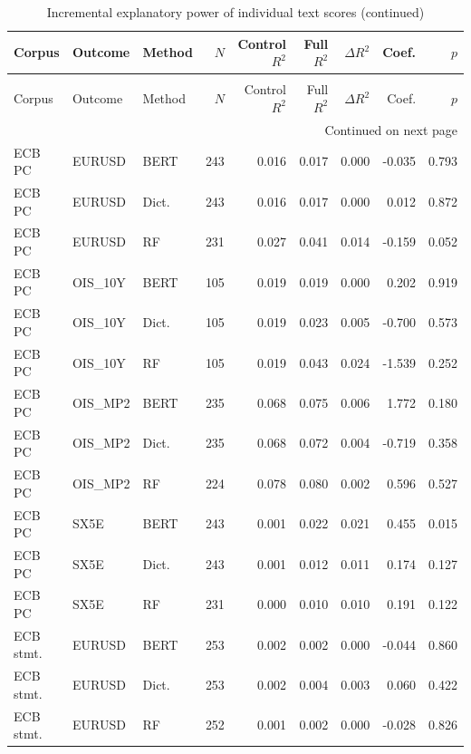 \begingroup
\scriptsize
\setlength{\tabcolsep}{3pt}
\renewcommand{\arraystretch}{0.93}
\begin{longtable}{@{}p{2.15cm}p{1.25cm}p{0.95cm}rrrrrr@{}}
\caption{Incremental explanatory power of individual text scores}
\label{tab:a2_incremental_r2}\\
\toprule
Corpus & Outcome & Method & $N$ & Control $R^2$ & Full $R^2$ & $\Delta R^2$ & Coef. & $p$ \\
\midrule
\endfirsthead
\caption[]{Incremental explanatory power of individual text scores (continued)}\\
\toprule
Corpus & Outcome & Method & $N$ & Control $R^2$ & Full $R^2$ & $\Delta R^2$ & Coef. & $p$ \\
\midrule
\endhead
\midrule
\multicolumn{9}{r}{\footnotesize Continued on next page}\\
\endfoot
\bottomrule
\endlastfoot
ECB PC & EURUSD & BERT & 243 & 0.016 & 0.017 & 0.000 & -0.035 & 0.793 \\
ECB PC & EURUSD & Dict. & 243 & 0.016 & 0.017 & 0.000 & 0.012 & 0.872 \\
ECB PC & EURUSD & RF & 231 & 0.027 & 0.041 & 0.014 & -0.159 & 0.052 \\
ECB PC & OIS\_10Y & BERT & 105 & 0.019 & 0.019 & 0.000 & 0.202 & 0.919 \\
ECB PC & OIS\_10Y & Dict. & 105 & 0.019 & 0.023 & 0.005 & -0.700 & 0.573 \\
ECB PC & OIS\_10Y & RF & 105 & 0.019 & 0.043 & 0.024 & -1.539 & 0.252 \\
ECB PC & OIS\_MP2 & BERT & 235 & 0.068 & 0.075 & 0.006 & 1.772 & 0.180 \\
ECB PC & OIS\_MP2 & Dict. & 235 & 0.068 & 0.072 & 0.004 & -0.719 & 0.358 \\
ECB PC & OIS\_MP2 & RF & 224 & 0.078 & 0.080 & 0.002 & 0.596 & 0.527 \\
ECB PC & SX5E & BERT & 243 & 0.001 & 0.022 & 0.021 & 0.455 & 0.015 \\
ECB PC & SX5E & Dict. & 243 & 0.001 & 0.012 & 0.011 & 0.174 & 0.127 \\
ECB PC & SX5E & RF & 231 & 0.000 & 0.010 & 0.010 & 0.191 & 0.122 \\
ECB stmt. & EURUSD & BERT & 253 & 0.002 & 0.002 & 0.000 & -0.044 & 0.860 \\
ECB stmt. & EURUSD & Dict. & 253 & 0.002 & 0.004 & 0.003 & 0.060 & 0.422 \\
ECB stmt. & EURUSD & RF & 252 & 0.001 & 0.002 & 0.000 & -0.028 & 0.826 \\

\end{longtable}
